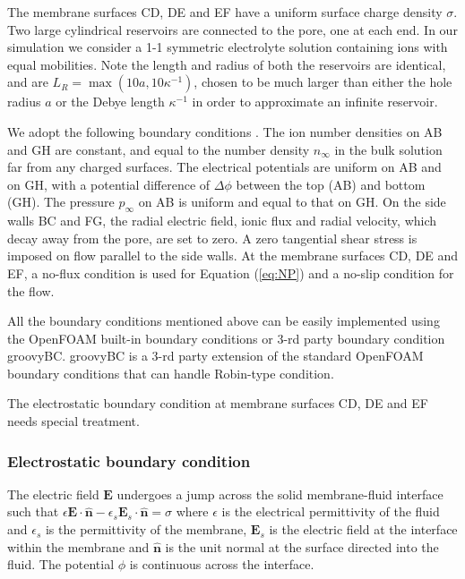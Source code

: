 The membrane surfaces CD, DE and EF have a uniform surface charge density $\sigma$. Two large cylindrical reservoirs are connected to the pore, one at each end. In our simulation we consider a 1-1 symmetric electrolyte solution containing ions with equal mobilities. Note the length and radius of both the reservoirs are identical, and are $L_R=\max(10a, 10\kappa^{-1})$, chosen to be much larger than either the hole radius $a$ or the Debye length $\kappa^{-1}$  in order to approximate an infinite reservoir. 

We adopt the following boundary conditions \cite{Mao2013}. The ion number densities on AB and GH are constant, and equal to the number density $n_\infty$ in the bulk solution far from any charged surfaces. The electrical potentials are uniform on AB and on GH, with a potential difference of $\Delta\phi$ between the top (AB) and bottom (GH). The pressure $p_{\infty}$ on AB is uniform and equal to that on GH. On the side walls BC and FG, the radial electric field, ionic flux and radial velocity, which decay away from the pore, are set to zero. A zero tangential shear stress is imposed on flow parallel to the side walls. At the membrane surfaces CD, DE and EF, a no-flux condition is used for Equation (\ref{eq:NP}) and a no-slip condition for the flow. 

All the boundary conditions mentioned above can be easily implemented using the OpenFOAM built-in boundary conditions or 3-rd party boundary condition \textsf{groovyBC}. \textsf{groovyBC} is a 3-rd party extension of the standard OpenFOAM boundary conditions that can handle Robin-type condition.

The electrostatic boundary condition at membrane surfaces CD, DE and EF needs special treatment.

\subsubsection{Electrostatic boundary condition}
The electric field $\mathbf{E}$ undergoes a jump across the solid membrane-fluid interface such that
$\epsilon \mathbf{E} \cdot  \hat{\mathbf{n}} - \epsilon_{s} \mathbf{E}_{s} \cdot \hat{\mathbf{n}} = \sigma$ 
where $\epsilon$ is the electrical permittivity of the fluid and $\epsilon_{s}$ is the permittivity of the membrane, $\mathbf{E}_{s}$ is the electric field at the interface within the membrane and $\hat{\mathbf{n}}$ is the unit normal at the surface directed into the fluid. The potential $\phi$ is continuous across the interface. 

